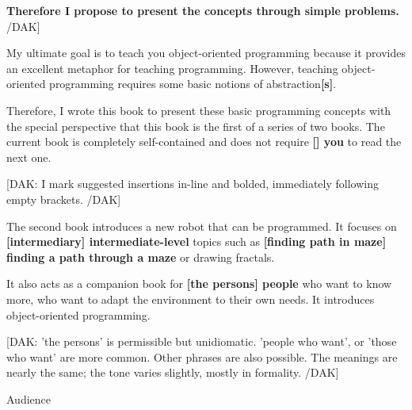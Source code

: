 \documentclass[12pt,a4paper]{article}
\begin{document}
\textbf{Therefore I propose to present the concepts through simple problems.} /DAK]





My ultimate goal is to teach you object-oriented programming because it provides an excellent metaphor for teaching programming. However, teaching object-oriented programming requires some basic notions of abstraction\textbf{[}\textbf{s}\textbf{]}. 





Therefore, I wrote this book to present these basic programming concepts with the special perspective that this book is the first of a series of two books. The current book is completely self-contained and does not require\textbf{ [] you }to read {the next one. }





[DAK: I mark suggested insertions in-line and bolded, immediately following empty brackets. /DAK]








The second book introduces a new robot that can be programmed. It focuses on\textbf{ [intermediary] intermediate-level }topics such as\textbf{ [finding path in maze] finding a path through a maze }{or drawing fractals. }





It also acts as a companion book for\textbf{ [the persons] people }who want {to know more, who want to adapt the environment to their own needs. It introduces object-oriented programming. }


\begin{flushleft}

\end{flushleft}


[DAK: 'the persons' is permissible but unidiomatic.  'people who want', or 'those who want' are more common.  Other phrases are also possible.  The meanings are nearly the same; the tone varies slightly, mostly in formality. /DAK]





\begin{flushleft}

\end{flushleft}


Audience 
\end{document}
